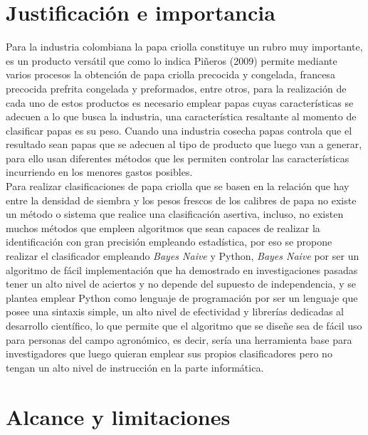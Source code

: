 \section{Justificaci\'on e importancia}

Para la industria colombiana la papa criolla constituye un rubro muy importante, es un producto versátil que como lo indica Piñeros (2009) permite mediante varios procesos la obtención de papa criolla precocida y congelada, francesa precocida prefrita congelada y preformados, entre otros, para la realización de cada uno de estos productos es necesario emplear papas cuyas características se adecuen a lo que busca la industria, una característica resaltante al momento de clasificar papas es su peso. Cuando una industria cosecha papas controla que el resultado sean papas que se adecuen al tipo de producto que luego van a generar, para ello usan diferentes métodos que les permiten controlar las características incurriendo en los menores gastos posibles.\\

Para realizar clasificaciones de papa criolla que se basen en la relación que hay entre la densidad de siembra y los pesos frescos de los calibres de papa no existe un método o sistema que realice una clasificación asertiva, incluso, no existen muchos métodos que empleen algoritmos que sean capaces de realizar la identificación con gran precisión empleando estadística, por eso se propone realizar el clasificador empleando \textit{Bayes Naive} y Python, \textit{Bayes Naive} por ser un algoritmo de fácil implementación que ha demostrado en investigaciones pasadas tener un alto nivel de aciertos y no depende del supuesto de independencia, y se plantea emplear Python como lenguaje de programación por ser un lenguaje que posee una sintaxis simple, un alto nivel de efectividad y librerías dedicadas al desarrollo científico, lo que permite que el algoritmo que se diseñe sea de fácil uso para personas del campo agronómico, es decir, sería una herramienta base para investigadores que luego quieran emplear sus propios clasificadores pero no tengan un alto nivel de instrucción en la parte informática.

\section{Alcance y limitaciones}

